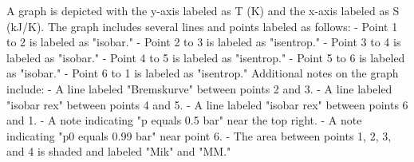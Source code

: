 A graph is depicted with the y-axis labeled as T (K) and the x-axis labeled as S (kJ/K). The graph includes several lines and points labeled as follows:
- Point 1 to 2 is labeled as "isobar."
- Point 2 to 3 is labeled as "isentrop."
- Point 3 to 4 is labeled as "isobar."
- Point 4 to 5 is labeled as "isentrop."
- Point 5 to 6 is labeled as "isobar."
- Point 6 to 1 is labeled as "isentrop."
Additional notes on the graph include:
- A line labeled "Bremskurve" between points 2 and 3.
- A line labeled "isobar rex" between points 4 and 5.
- A line labeled "isobar rex" between points 6 and 1.
- A note indicating "p equals 0.5 bar" near the top right.
- A note indicating "p0 equals 0.99 bar" near point 6.
- The area between points 1, 2, 3, and 4 is shaded and labeled "Mik" and "MM."